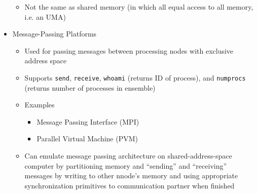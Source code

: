 \documentclass[a4paper]{article}
\begin{document}
\begin{itemize}
\begin{itemize}
      \item Not the same as shared memory (in which all equal access to all memory, i.e. an UMA)
    \end{itemize}
  \item Message-Passing Platforms
    \begin{itemize}
      \item Used for passing messages between processing nodes with exclusive address space
      \item Supports \texttt{send}, \texttt{receive}, \texttt{whoami} (returns ID of process), and \texttt{numprocs} (returns number of processes in
        ensemble)
      \item Examples
        \begin{itemize}
          \item Message Passing Interface (MPI)
          \item Parallel Virtual Machine (PVM)
        \end{itemize}
      \item Can emulate message passing architecture on shared-address-space computer by partitioning memory and ``sending'' and ``receiving'' messages by writing to
        other nnode's memory and using appropriate synchronization primitives to communication partner when finished
    \end{itemize}
\end{itemize}
\end{document}
